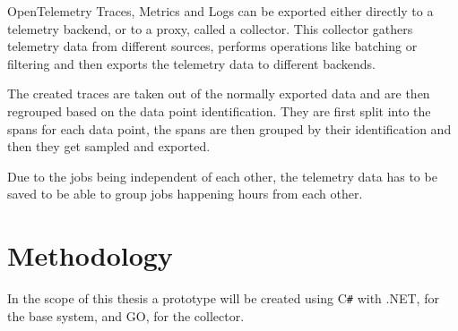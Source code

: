 OpenTelemetry Traces, Metrics and Logs can be exported either directly to a telemetry backend, 
or to a proxy, called a collector. This collector gathers telemetry data from different sources,
performs operations like batching or filtering and then exports the telemetry data to different
backends.

The created traces are taken out of the normally exported data and are then regrouped based
on the data point identification. They are first split into the spans for each data point,
the spans are then grouped by their identification and then they get sampled and exported.

Due to the jobs being independent of each other, the telemetry data has to be saved
to be able to group jobs happening hours from each other.

\section{Methodology}




In the scope of this thesis a prototype will be created using C\verb|#| with .NET,
for the base system, and GO, for the collector.